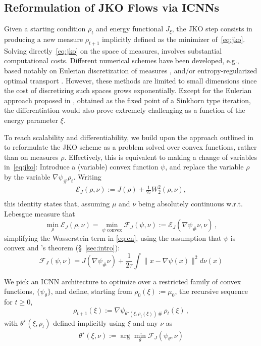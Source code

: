 \subsection{Reformulation of JKO Flows via ICNNs} \label{sec:jko_icnn}
Given a starting condition $\rho_t$ and energy functional $J_\xi$, the JKO step consists in producing a new measure $\rho_{t+1}$ implicitly defined as the minimizer of~\eqref{eq:jko}. Solving directly~\eqref{eq:jko} on the space of measures, involves substantial computational costs. Different numerical schemes have been developed, e.g., based notably on Eulerian discretization of measures \citep{carrillo2021primal, benamou2016}, and/or entropy-regularized optimal transport \citep{2015-Peyre-siims}. However, these methods are limited to small dimensions since the cost of discretizing such spaces grows exponentially. Except for the Eulerian approach proposed in \citep{2015-Peyre-siims}, obtained as the fixed point of a Sinkhorn type iteration, the differentiation would also prove extremely challenging as a function of the energy parameter $\xi$.

 To reach scalability and differentiability, we build upon the approach outlined in \citet{benamou2016} to reformulate the JKO scheme as a problem solved over convex functions, rather than on measures $\rho$. Effectively, this is equivalent to making a change of variables in~\eqref{eq:jko}: Introduce a (variable) convex function $\psi$, and replace the variable $\rho$ by the variable $\nabla \psi_{\#}\rho_t$. Writing
\begin{equation}\label{eq:en}
\begin{split}
\mathcal{E}_J(\rho, \nu) := J(\rho) +\frac{1}{2 \tau}W_2^2(\rho, \nu),\\
\end{split}
\end{equation}
this identity states that, assuming $\mu$ and $\nu$ being absolutely continuous w.r.t. Lebesgue measure that
$$\min_{\rho}\mathcal{E}_J(\rho,\nu) = \min_{\psi \text{ convex}} \mathcal{F}_J(\psi, \nu):= \mathcal{E}_J(\nabla \psi_{\#}\nu, \nu)\,,$$
simplifying the Wasserstein term in \eqref{eq:en}, using the assumption that $\psi$ is convex and \citeauthor{Brenier1987}'s theorem (\S~\ref{sec:intro}):
\begin{equation}\mathcal{F}_J(\psi, \nu) = J(\nabla \psi_{\#}\nu) +\frac{1}{2 \tau} \!\! \int\!\! \| x - \nabla \psi(x) \|^2 d \nu(x)\label{eq:JKO_psi}
\end{equation}

We pick an ICNN architecture to optimize over a restricted family of convex functions, $\{\psi_{\theta}\}$, and define, starting from $\rho_0(\xi):=\mu_0$, the recursive sequence for $t\geq 0$,
\begin{equation} \label{eq:next_pop}
\rho_{t+1}(\xi) := \nabla \psi_{\theta^\star\!(\xi, \rho_t(\xi))\, \#}\, \rho_{t}(\xi)\,,
\end{equation}
with $\theta^\star(\xi, \rho_t)$ defined implicitly using $\xi$ and any $\nu$ as 
\begin{align} \label{eq:thetastar}
    \theta^\star(\xi, \nu):=\arg \min_{\theta} \mathcal{F}_J(\psi_{\theta},\nu)
\end{align}

